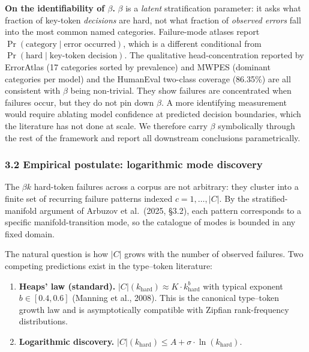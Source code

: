 \documentclass[
]{article}
\begin{document}
\textbf{On the identifiability of \(\beta\).} \(\beta\) is a
\emph{latent} stratification parameter: it asks what fraction of
key-token \emph{decisions} are hard, not what fraction of \emph{observed
errors} fall into the most common named categories. Failure-mode atlases
report \(\Pr(\text{category} \mid \text{error occurred})\), which is a
different conditional from
\(\Pr(\text{hard} \mid \text{key-token decision})\). The qualitative
head-concentration reported by ErrorAtlas (17 categories sorted by
prevalence) and MWPES (dominant categories per model) and the HumanEval
two-class coverage (86.35\%) are all consistent with \(\beta\) being
non-trivial. They show failures are concentrated when failures occur,
but they do not pin down \(\beta\). A more identifying measurement would
require ablating model confidence at predicted decision boundaries,
which the literature has not done at scale. We therefore carry \(\beta\)
symbolically through the rest of the framework and report all downstream
conclusions parametrically.

\subsubsection{3.2 Empirical postulate: logarithmic mode
discovery}\label{empirical-postulate-logarithmic-mode-discovery}

The \(\beta k\) hard-token failures across a corpus are not arbitrary:
they cluster into a finite set of recurring failure patterns indexed
\(c = 1, \ldots, |C|\). By the stratified-manifold argument of Arbuzov
et al.~(2025, §3.2), each pattern corresponds to a specific
manifold-transition mode, so the catalogue of modes is bounded in any
fixed domain.

The natural question is how \(|C|\) grows with the number of observed
failures. Two competing predictions exist in the type--token literature:

\begin{enumerate}
\def\labelenumi{\arabic{enumi}.}
\item
  \textbf{Heaps' law (standard).}
  \(|C|(k_{\text{hard}}) \approx K \cdot k_{\text{hard}}^{b}\) with
  typical exponent \(b \in [0.4, 0.6]\) (Manning et al., 2008). This is
  the canonical type--token growth law and is asymptotically compatible
  with Zipfian rank-frequency distributions.
\item
  \textbf{Logarithmic discovery.}
  \(|C|(k_{\text{hard}}) \leq A + \sigma \cdot \ln(k_{\text{hard}})\).
\end{enumerate}
\end{document}
